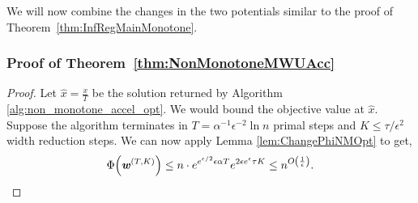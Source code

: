\documentclass[11pt]{article}
\let\originalleft\left
\let\originalright\right
\renewcommand{\left}{\mathopen{}\mathclose\bgroup\originalleft}
\renewcommand{\right}{\aftergroup\egroup\originalright}
\newcommand\ww{\boldsymbol{\mathit{w}}}
\newcommand\xx{\boldsymbol{\mathit{x}}}
\newcommand\xxhat{\widehat{\xx}}
\begin{document}
We will now combine the changes in the two potentials similar to the proof of Theorem~\ref{thm:InfRegMainMonotone}.
\subsubsection*{Proof of Theorem~\ref{thm:NonMonotoneMWUAcc}}
\begin{proof}
Let $\xxhat = \frac{\xx}{T}$ be the solution returned by Algorithm \ref{alg:non_monotone_accel_opt}. We would bound the objective value at $\xxhat$. Suppose the algorithm terminates in $T = \alpha^{-1}\epsilon^{-2}\ln n$ primal steps and $K \leq \tau/\epsilon^2$ width reduction steps. We can now apply Lemma \ref{lem:ChangePhiNMOpt} to get,
\[
\Phi\left(\ww^{(T,K)}\right) \le  n\cdot  e^{e^{\epsilon/2}\epsilon\alpha T} e^{2\epsilon e^{\epsilon}\tau K} \leq   n^{O\left(\frac{1}{\epsilon} \right)}.
\]


\end{proof}
\end{document}
